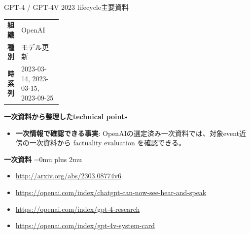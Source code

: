 \begin{technicalnote}{GPT-4 / GPT-4V 2023 lifecycle}{主要資料}
\begingroup
\begin{tabularx}{\linewidth}{@{}>{\bfseries}p{0.22\linewidth}X@{}}
組織 & OpenAI \\
種別 & モデル更新 \\
時系列 & 2023-03-14, 2023-03-15, 2023-09-25 \\
\end{tabularx}
\smallskip
{\bfseries 一次資料から整理したtechnical points}
\begin{itemize}[leftmargin=1.5em,itemsep=0.35em]
\item \textbf{一次情報で確認できる事実}: OpenAIの選定済み一次資料では、対象event近傍の一次資料から factuality evaluation を確認できる。
\end{itemize}
\begin{minipage}{\linewidth}
\begin{samepage}
{\bfseries 一次資料}
\begingroup\sloppy
\Urlmuskip=0mu plus 2mu\relax
\begin{itemize}[leftmargin=1.5em,itemsep=0.25em]
\item {\scriptsize\url{http://arxiv.org/abs/2303.08774v6}}
\item {\scriptsize\url{https://openai.com/index/chatgpt-can-now-see-hear-and-speak}}
\item {\scriptsize\url{https://openai.com/index/gpt-4-research}}
\item {\scriptsize\url{https://openai.com/index/gpt-4v-system-card}}
\end{itemize}
\endgroup
\end{samepage}
\end{minipage}
\endgroup
\end{technicalnote}
\medskip

